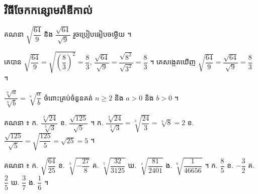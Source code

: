 \subsection{វិធីចែកកន្សោមរ៉ាឌីកាល់}
\begin{example}[ឧទាហរណ៍]
គណនា $\sqrt{\dfrac{64}{9}}$ និង $\dfrac{\sqrt{64}}{\sqrt{9}}$ រួចប្រៀបធៀបចម្លើយ ។
\end{example}
គេបាន $\sqrt{\dfrac{64}{9}} = \sqrt{\left(\dfrac{8}{3}\right)^2} = \dfrac{8}{3}$, $\dfrac{\sqrt{64}}{\sqrt{9}} = \dfrac{\sqrt{8^2}}{\sqrt{3^2}} = \dfrac{8}{3}$ ។ គេសង្កេតឃើញ $\sqrt{\dfrac{64}{9}} = \dfrac{\sqrt{64}}{\sqrt{9}} = \dfrac{8}{3}$ ។
\begin{formulaBox}[ជាទូទៅ]
$\dfrac{\sqrt[n]{a}}{\sqrt[n]{b}} = \sqrt[n]{\dfrac{a}{b}}$ ចំពោះគ្រប់ចំនួនគត់ $n \ge 2$ និង $a > 0$ និង $b > 0$ ។
\end{formulaBox}
\begin{example}[លំហាត់គំរូ]
គណនា ៖ \quad ក. $\dfrac{\sqrt[3]{24}}{\sqrt[3]{3}}$ \quad ខ. $\dfrac{\sqrt{125}}{\sqrt{5}}$ ។
\ans
ក. $\dfrac{\sqrt[3]{24}}{\sqrt[3]{3}} = \sqrt[3]{\dfrac{24}{3}} = \sqrt[3]{8} = 2$ \quad ខ. $\dfrac{\sqrt{125}}{\sqrt{5}} = \sqrt{\dfrac{125}{5}} = \sqrt{25} = 5$ ។
\end{example}
\begin{pro}
គណនា ៖ \quad ក. $\sqrt{\dfrac{64}{25}}$ \quad ខ. $\sqrt[3]{-\dfrac{27}{8}}$ \quad គ. $\sqrt[5]{\dfrac{32}{3125}}$ \quad ឃ. $\sqrt[4]{\dfrac{81}{2401}}$ \quad ង. $\sqrt[6]{\dfrac{1}{46656}}$ ។
\ans
ក. $\dfrac{8}{5}$ \quad ខ. $-\dfrac{3}{2}$ \quad គ. $\dfrac{2}{5}$ \quad ឃ. $\dfrac{3}{7}$ \quad ង. $\dfrac{1}{6}$ ។
\end{pro}

